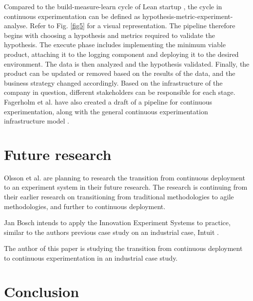 \documentclass[conference]{IEEEtran}
\begin{document}
Compared to the build-measure-learn cycle of Lean startup \cite{ries2011lean}, the cycle in continuous experimentation can be defined as hypothesis-metric-experiment-analyse. Refer to Fig. \ref{fig5} for a visual representation. The pipeline therefore begins with choosing a hypothesis and metrics required to validate the hypothesis. The execute phase includes implementing the minimum viable product, attaching it to the logging component and deploying it to the desired environment. The data is then analyzed and the hypothesis validated. Finally, the product can be updated or removed based on the results of the data, and the business strategy changed accordingly. Based on the infrastructure of the company in question, different stakeholders can be responsible for each stage. Fagerholm et al. have also created a draft of a pipeline for continuous experimentation, along with the general continuous experimentation infrastructure model \cite{fagerholm2014building}.



\section{Future research} %
Olsson et al. are planning to research the transition from continuous deployment to an experiment system in their future research. The research is continuing from their earlier research on transitioning from traditional methodologies to agile methodologies, and further to continuous deployment. \cite{olsson2012climbing}

Jan Bosch intends to apply the Innovation Experiment Systems to practice, similar to the authors previous case study on an industrial case, Intuit \cite{bosch2012building}.

The author of this paper is studying the transition from continuous deployment to continuous experimentation in an industrial case study.
\section{Conclusion} %
\end{document}
